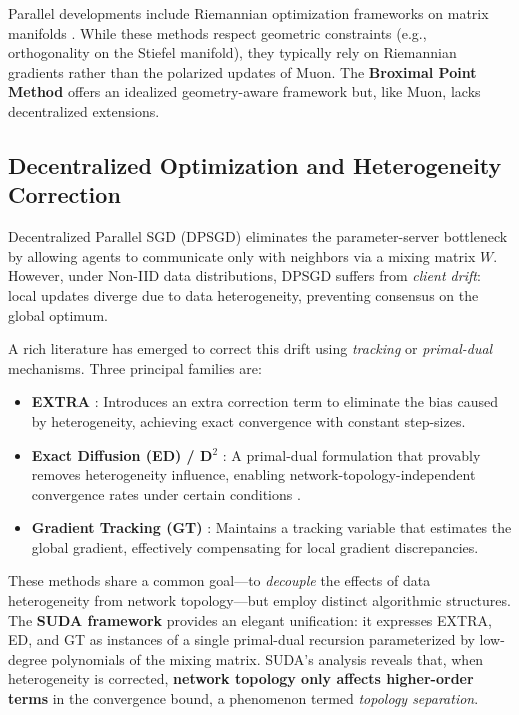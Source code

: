 Parallel developments include Riemannian optimization frameworks on matrix manifolds \cite{chen2021decentralized, wang2024proximal}. While these methods respect geometric constraints (e.g., orthogonality on the Stiefel manifold), they typically rely on Riemannian gradients rather than the polarized updates of Muon. The \textbf{Broximal Point Method} \cite{gruntkowska2025non} offers an idealized geometry-aware framework but, like Muon, lacks decentralized extensions.

\subsection{Decentralized Optimization and Heterogeneity Correction}

Decentralized Parallel SGD (DPSGD) eliminates the parameter-server bottleneck by allowing agents to communicate only with neighbors via a mixing matrix $W$. However, under Non-IID data distributions, DPSGD suffers from \emph{client drift}: local updates diverge due to data heterogeneity, preventing consensus on the global optimum.

A rich literature has emerged to correct this drift using \emph{tracking} or \emph{primal-dual} mechanisms. Three principal families are:
\begin{itemize}
    \item \textbf{EXTRA} \cite{shi2015extra}: Introduces an extra correction term to eliminate the bias caused by heterogeneity, achieving exact convergence with constant step-sizes.
    \item \textbf{Exact Diffusion (ED) / D$^2$} \cite{alghunaim2023local}: A primal-dual formulation that provably removes heterogeneity influence, enabling network-topology-independent convergence rates under certain conditions \cite{yuan2021removing}.
    \item \textbf{Gradient Tracking (GT)} \cite{song2021optimal}: Maintains a tracking variable that estimates the global gradient, effectively compensating for local gradient discrepancies.
\end{itemize}

These methods share a common goal---to \emph{decouple} the effects of data heterogeneity from network topology---but employ distinct algorithmic structures. The \textbf{SUDA framework} \cite{yuan2021unified} provides an elegant unification: it expresses EXTRA, ED, and GT as instances of a single primal-dual recursion parameterized by low-degree polynomials of the mixing matrix. SUDA's analysis reveals that, when heterogeneity is corrected, \textbf{network topology only affects higher-order terms} in the convergence bound, a phenomenon termed \emph{topology separation}.

